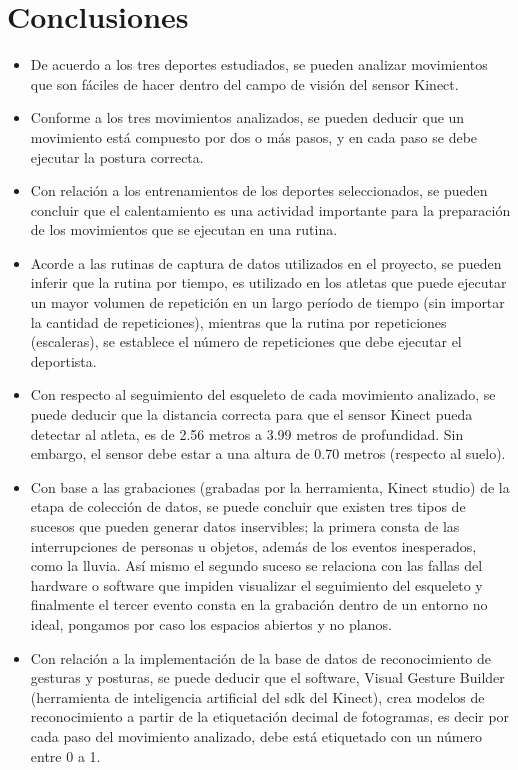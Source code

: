 \section{Conclusiones} \label{ded:con}
\begin{itemize}
\item De acuerdo a los tres deportes estudiados, se pueden analizar movimientos que son f\'aciles de hacer dentro del campo de visi\'on del sensor Kinect.
\item Conforme a los tres movimientos analizados, se pueden deducir que un movimiento est\'a compuesto por dos o m\'as pasos, y en cada paso se debe ejecutar  la postura correcta.
\item Con relaci\'on a los entrenamientos de los deportes seleccionados, se pueden concluir que el calentamiento es una actividad importante para la preparaci\'on de los movimientos que se ejecutan en una rutina.
\item Acorde a las rutinas de captura de datos utilizados en el proyecto,  se pueden inferir que la rutina por tiempo, es utilizado en los atletas que puede ejecutar un mayor volumen de repetici\'on en un largo per\'iodo de tiempo (sin importar la cantidad de repeticiones), mientras que la rutina por repeticiones (escaleras), se establece el n\'umero de repeticiones que debe ejecutar el deportista.
\item  Con respecto al seguimiento del esqueleto de cada movimiento analizado, se puede deducir que la distancia correcta para que el sensor Kinect pueda detectar al atleta, es de  2.56 metros a 3.99 metros de profundidad. Sin embargo, el sensor debe estar a una altura de 0.70 metros (respecto al suelo).
\item  Con base a las grabaciones (grabadas por la herramienta, Kinect studio) de la etapa de colecci\'on de datos, se puede concluir que existen  tres tipos de sucesos que pueden generar datos inservibles; la primera consta de las interrupciones de personas u objetos, adem\'as de los eventos inesperados, como la lluvia. As\'i mismo el segundo suceso se relaciona con las fallas del hardware o software que impiden visualizar el seguimiento del esqueleto y finalmente el tercer evento consta en la grabaci\'on dentro de un entorno no ideal, pongamos por caso los espacios abiertos y no planos.
\item Con relaci\'on a la implementaci\'on de la base de datos de reconocimiento de gesturas y posturas, se puede deducir que el software, Visual Gesture Builder (herramienta de inteligencia artificial del sdk del Kinect), crea modelos de reconocimiento a partir de la etiquetaci\'on decimal de fotogramas, es decir por cada paso del movimiento analizado, debe est\'a etiquetado con un n\'umero entre 0 a 1.

\end{itemize}
